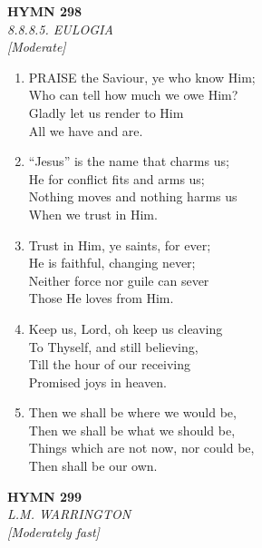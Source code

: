 \newpage
\begin{center}
    {\Large \textbf{HYMN 298}}
    \\
    \textit{8.8.8.5. EULOGIA}
    \\
    \textit{\small [Moderate]}
\end{center}
\vspace{1em}

\begin{enumerate}
    \item PRAISE the Saviour, ye who know Him; \\
        Who can tell how much we owe Him? \\
        Gladly let us render to Him \\
        All we have and are.

    \item ``Jesus'' is the name that charms us; \\
        He for conflict fits and arms us; \\
        Nothing moves and nothing harms us \\
        When we trust in Him.

    \item Trust in Him, ye saints, for ever; \\
        He is faithful, changing never; \\
        Neither force nor guile can sever \\
        Those He loves from Him.

    \item Keep us, Lord, oh keep us cleaving \\
        To Thyself, and still believing, \\
        Till the hour of our receiving \\
        Promised joys in heaven.

    \item Then we shall be where we would be, \\
        Then we shall be what we should be, \\
        Things which are not now, nor could be, \\
        Then shall be our own.

\end{enumerate}

\newpage
\begin{center}
    {\Large \textbf{HYMN 299}}
    \\
    \textit{L.M. WARRINGTON}
    \\
    \textit{\small [Moderately fast]}
\end{center}
\vspace{1em}

